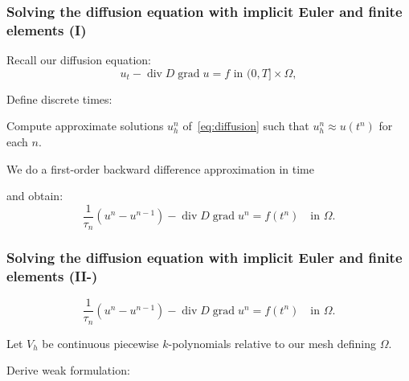 \documentclass[mathserif, aspectratio=169]{beamer}
\DeclareMathOperator{\Div}{\mathrm{div}}
\DeclareMathOperator{\Grad}{\mathrm{grad}}
\begin{document}
\begin{frame}
\frametitle{Solving the diffusion equation with implicit Euler and finite elements (I)}

Recall our diffusion equation:
\begin{equation*}
  u_t - \Div D \Grad u = f \text{ in } (0, T] \times \Omega, 
\end{equation*}

Define discrete times: 


\bigskip
\bigskip

Compute approximate solutions $u^n_h$ of~\eqref{eq:diffusion} such
that $u^n_h \approx u(t^n)$ for each $n$.

\medskip
We do a first-order backward difference approximation in time

\bigskip
\bigskip

and obtain:
\begin{equation}
  \label{eq:chp3:time-discrete}
  \frac{1}{\tau_n} (u^n - u^{n-1}) - \Div D \Grad u^n = f(t^n) \quad \text{in } \Omega. 
\end{equation}

\end{frame}


\begin{frame}
  \frametitle{Solving the diffusion equation with implicit Euler and finite elements (II-)}

  \begin{equation*}
    \frac{1}{\tau_n} (u^n - u^{n-1}) - \Div D \Grad u^n = f(t^n) \quad \text{in } \Omega. 
  \end{equation*}

  Let $V_h$ be continuous piecewise $k$-polynomials relative to
  our mesh defining $\Omega$.

  \bigskip
  Derive weak formulation: 
  \vspace{10em}
  
\end{frame}
\end{document}
